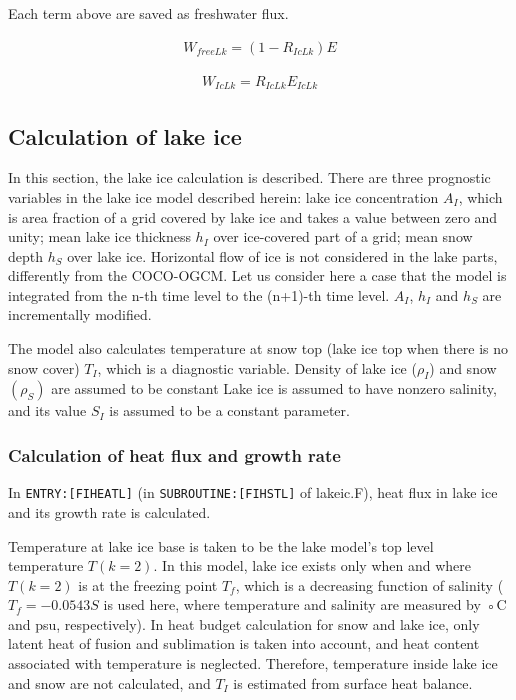 Each term above are saved as freshwater flux.

\begin{eqnarray}
    W_{freeLk} = (1-R_{IcLk}) E
\end{eqnarray}

\begin{eqnarray}
    W_{IcLk} = R_{IcLk} E_{IcLk}
\end{eqnarray}

\hypertarget{calculation-of-lake-ice}{%
\subsection{Calculation of lake ice}\label{calculation-of-lake-ice}}

In this section, the lake ice calculation is described. There are three
prognostic variables in the lake ice model described herein: lake ice
concentration \(A_I\), which is area fraction of a grid covered by lake
ice and takes a value between zero and unity; mean lake ice thickness
\(h_I\) over ice-covered part of a grid; mean snow depth \(h_S\) over
lake ice. Horizontal flow of ice is not considered in the lake parts,
differently from the COCO-OGCM. Let us consider here a case that the
model is integrated from the n-th time level to the (n+1)-th time level.
\(A_I\), \(h_I\) and \(h_S\) are incrementally modified.

The model also calculates temperature at snow top (lake ice top when
there is no snow cover) \(T_I\), which is a diagnostic variable. Density
of lake ice (\(\rho_I\)) and snow \((\rho_S)\) are assumed to be
constant Lake ice is assumed to have nonzero salinity, and its value
\(S_I\) is assumed to be a constant parameter.

\hypertarget{calculation-of-heat-flux-and-growth-rate}{%
\subsubsection{Calculation of heat flux and growth
rate}\label{calculation-of-heat-flux-and-growth-rate}}

In \texttt{ENTRY:{[}FIHEATL{]}} (in \texttt{SUBROUTINE:{[}FIHSTL{]}} of
lakeic.F), heat flux in lake ice and its growth rate is calculated.

Temperature at lake ice base is taken to be the lake model's top level
temperature \(T(k=2)\). In this model, lake ice exists only when and
where \(T(k=2)\) is at the freezing point \(T_f\), which is a decreasing
function of salinity (\(T_f= −0.0543 S\) is used here, where temperature
and salinity are measured by ◦C and psu, respectively). In heat budget
calculation for snow and lake ice, only latent heat of fusion and
sublimation is taken into account, and heat content associated with
temperature is neglected. Therefore, temperature inside lake ice and
snow are not calculated, and \(T_I\) is estimated from surface heat
balance.

